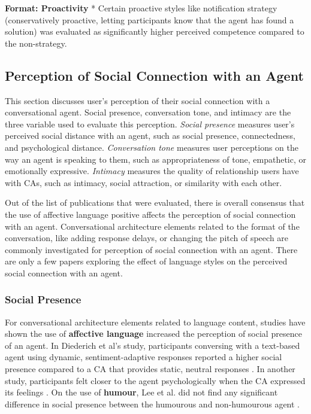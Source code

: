 \documentclass[sigconf,screen,review, anonymous]{acmart}
\newcommand{\cmt}[1]{}%
\begin{document}
\textbf{Format: Proactivity}
* Certain proactive styles like notification strategy (conservatively proactive, letting participants know that the agent has found a solution) was evaluated as significantly higher perceived competence compared to the non-strategy. \cite{kraus2020effects}\cmt{[64]}

\subsection{Perception of Social Connection with an Agent}

This section discusses user's perception of their social connection with a conversational agent. Social presence, conversation tone, and intimacy are the three variable used to evaluate this perception. \textit{Social presence} measures user's perceived social distance with an agent, such as social presence, connectedness, and psychological distance. \textit{Conversation tone} measures user perceptions on the way an agent is speaking to them, such as appropriateness of tone, empathetic, or emotionally expressive. \textit{Intimacy} measures the quality of relationship users have with CAs, such as intimacy, social attraction, or similarity with each other.

Out of the list of publications that were evaluated, there is overall consensus that the use of affective language positive affects the perception of social connection with an agent. Conversational architecture elements related to the format of the conversation, like adding response delays, or changing the pitch of speech are commonly investigated for perception of social connection with an agent. There are only a few papers exploring the effect of language styles on the perceived social connection with an agent. 

\subsubsection{Social Presence}
For conversational architecture elements related to language content, studies have shown the use of \textbf{affective language} increased the perception of social presence of an agent. In Diederich et al's study, participants conversing with a text-based agent using dynamic, sentiment-adaptive responses reported a higher social presence compared to a CA that provides static, neutral responses \cite{diederich2019emulating}\cmt{[25]}. In another study, participants felt closer to the agent psychologically when the CA expressed its feelings \cite{lee2019s}\cmt{[55]}. On the use of \textbf{humour}, Lee et al. did not find any significant difference in social presence between the humourous and non-humourous agent \cite{lee2019s}\cmt{[55]}.
\end{document}
